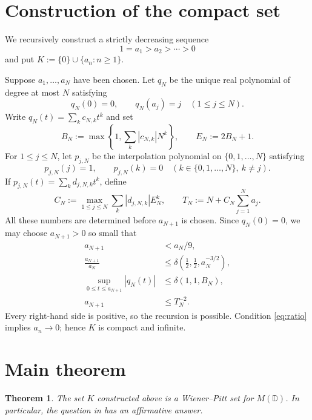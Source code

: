 \documentclass[11pt]{article}
\newtheorem{theorem}{Theorem}
\newcommand{\D}{\mathbb D}
\newcommand{\M}{M}
\begin{document}
\section{Construction of the compact set}

We recursively construct a strictly decreasing sequence
\[
 1=a_1>a_2>\cdots>0
\]
and put $K:=\{0\}\cup\{a_n:n\geq1\}$.

Suppose $a_1,\ldots,a_N$ have been chosen.  Let $q_N$ be the unique real
polynomial of degree at most $N$ satisfying
\[
 q_N(0)=0,
 \qquad q_N(a_j)=j\quad(1\leq j\leq N).
\]
Write $q_N(t)=\sum_k c_{N,k}t^k$ and set
\[
 B_N:=\max\left\{1,\sum_k|c_{N,k}|N^k\right\},
 \qquad E_N:=2B_N+1.
\]
For $1\leq j\leq N$, let $p_{j,N}$ be the interpolation polynomial on
$\{0,1,\ldots,N\}$ satisfying
\[
 p_{j,N}(j)=1,
 \qquad p_{j,N}(k)=0\quad(k\in\{0,1,\ldots,N\},\ k\ne j).
\]
If $p_{j,N}(t)=\sum_k d_{j,N,k}t^k$, define
\[
 C_N:=\max_{1\leq j\leq N}\sum_k|d_{j,N,k}|E_N^k,
 \qquad
 T_N:=N+C_N\sum_{j=1}^N a_j.
\]
All these numbers are determined before $a_{N+1}$ is chosen.  Since
$q_N(0)=0$, we may choose $a_{N+1}>0$ so small that
\begin{align}
 a_{N+1}&<a_N/9,\label{eq:ratio}\\
 \frac{a_{N+1}}{a_N}
 &\leq\delta\!\left(\tfrac12,\tfrac12,a_N^{-3/2}\right),
 \label{eq:tailround}\\
 \sup_{0\leq t\leq a_{N+1}}|q_N(t)|
 &\leq\delta(1,1,B_N),\label{eq:prefixround}\\
 a_{N+1}&\leq T_N^{-2}.\label{eq:start}
\end{align}
Every right-hand side is positive, so the recursion is possible.  Condition
\eqref{eq:ratio} implies $a_n\to0$; hence $K$ is compact and infinite.

\section{Main theorem}

\begin{theorem}\label{thm:main}
The set $K$ constructed above is a Wiener--Pitt set for $\M(\D)$.  In
particular, the question in \cite[Final Remarks, item 5]{OW} has an
affirmative answer.
\end{theorem}
\end{document}
